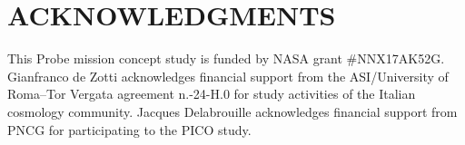 \documentclass[]{spie}  %
\begin{document}
\section{ACKNOWLEDGMENTS}

This Probe mission concept study is funded by NASA grant \#NNX17AK52G.  Gianfranco de Zotti acknowledges financial support from the ASI/University of
Roma--Tor Vergata agreement n.-24-H.0 for study activities of the Italian cosmology community. Jacques
Delabrouille acknowledges financial support from PNCG for participating to the PICO study.


\end{document}

